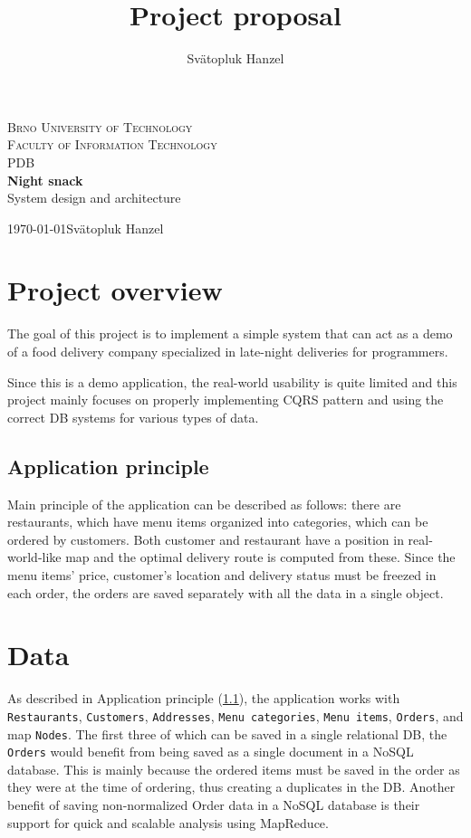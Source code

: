 \documentclass[11pt,a4paper]{article}
\author{Svätopluk Hanzel}
\title{Project proposal}
\begin{document}
\begin{titlepage}
	\begin{center}
		{\LARGE\textsc{Brno University of Technology}}\\
		\smallskip
		{\Large\textsc{Faculty of Information Technology}}\\
		\bigskip
		\smallskip
		\huge{PDB}\\
		\huge{\textbf{Night snack}}\\
		\Large{System design and architecture}
	\end{center}
	{\today \hfill Svätopluk Hanzel}
\end{titlepage}

\section{Project overview}
	The goal of this project is to implement a simple system that can act as a demo of a food delivery company specialized in late-night deliveries for programmers.
	
	Since this is a demo application, the real-world usability is quite limited and this project mainly focuses on properly implementing CQRS pattern and using the correct DB systems for various types of data.
	
	\subsection{Application principle}\label{sec:app-principle}
		Main principle of the application can be described as follows: there are restaurants, which have menu items organized into categories, which can be ordered by customers. Both customer and restaurant have a position in real-world-like map and the optimal delivery route is computed from these. Since the menu items' price, customer's location and delivery status must be freezed in each order, the orders are saved separately with all the data in a single object.

\section{Data}\label{sec:data}
	As described in Application principle (\ref{sec:app-principle}), the application works with \texttt{Restaurants}, \texttt{Customers}, \texttt{Addresses}, \texttt{Menu categories}, \texttt{Menu items}, \texttt{Orders}, and map \texttt{Nodes}. The first three of which can be saved in a single relational DB, the \texttt{Orders} would benefit from being saved as a single document in a NoSQL database. This is mainly because the ordered items must be saved in the order as they were at the time of ordering, thus creating a duplicates in the DB. Another benefit of saving non-normalized Order data in a NoSQL database is their support for quick and scalable analysis using MapReduce.
\end{document}
